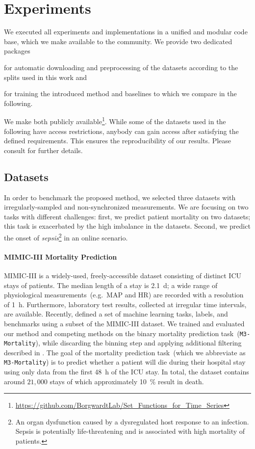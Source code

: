 \documentclass{article}
\newcommand{\dataset}[1]{\texttt{#1}}
\begin{document}
\section{Experiments}


We executed all experiments and implementations in a unified and modular code
base, which we make available to the community. We provide two dedicated
packages
\begin{inparaenum}[(i)]
    \item for automatic downloading and preprocessing of the datasets according to the splits
used in this work and
    \item for training the introduced method and baselines to which we compare
        in the following.
\end{inparaenum}
We make both publicly available\footnote{\url{https://github.com/BorgwardtLab/Set_Functions_for_Time_Series}}.
While some of the datasets used in the following have access restrictions,
anybody can gain access after satisfying the defined requirements.
This ensures the reproducibility of our results. Please consult
 for further details.

\subsection{Datasets}

In order to benchmark the proposed method, we selected three datasets
with irregularly-sampled and non-synchronized measurements. We are
focusing on two tasks with different challenges: first, we predict
patient mortality on two datasets; this task is exacerbated by the high
imbalance in the datasets. Second, we predict the onset of
\emph{sepsis}\footnote{An organ dysfunction caused by a dysregulated
host response to an infection. Sepsis is potentially life-threatening
and is associated with high mortality of patients.} in an online
scenario.

\paragraph{MIMIC-III Mortality Prediction}
MIMIC-III \citep{johnson2016mimic} is a widely-used, freely-accessible
dataset consisting of distinct ICU stays of patients. The median length
of a stay is \SI{2.1}{\day}; a wide range of physiological
measurements~(e.g.\ MAP and HR) are recorded with a resolution of
\SI{1}{\hour}.
Furthermore, laboratory test results, collected at irregular time
intervals, are available.
Recently, \citet{Harutyunyan2019} defined a set of machine learning tasks,
labels, and benchmarks using a subset of the MIMIC-III dataset.
We trained and evaluated our method and competing methods on the binary
mortality prediction task~(\dataset{M3-Mortality}), while discarding the
binning step and applying additional filtering
described in .
The goal of the mortality prediction task~(which we abbreviate as
\dataset{M3-Mortality}) is to predict whether
a patient will die during their hospital stay using only data from the
first \SI{48}{\hour} of the ICU stay. In total, the dataset contains
around $21,000$ stays of which approximately \SI{10}{\percent} result in
death.
\end{document}
